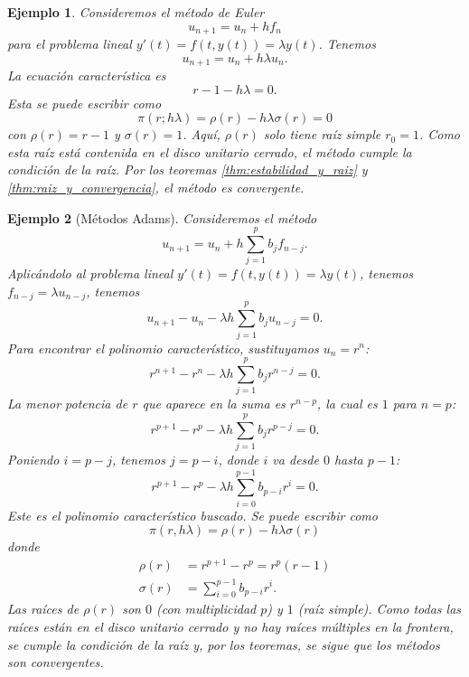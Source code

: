 \documentclass[11pt,letterpaper]{report}
\newtheorem{example}{Ejemplo}
\begin{document}
\begin{example}
  Consideremos el método de Euler
  \begin{equation}
    u_{n+1} = u_n + hf_n
  \end{equation}
  para el problema lineal $y'(t)=f(t,y(t))=\lambda y(t)$.
  Tenemos
  \begin{equation}
    u_{n+1} = u_n + h\lambda u_n
  .\end{equation}
  La ecuación característica es
  \begin{equation}
    r - 1 - h\lambda = 0
  .\end{equation}
  Esta se puede escribir como
  \begin{equation}
    \pi(r;h\lambda) = \rho(r) - h\lambda\sigma(r) = 0
  \end{equation}
  con $\rho(r)=r-1$ y $\sigma(r)=1$.
  Aquí, $\rho(r)$ solo tiene raíz simple $r_0=1$. Como esta raíz está
  contenida en el disco unitario cerrado, el método cumple la
  condición de la raíz. Por los teoremas
  \ref{thm:estabilidad_y_raiz} y \ref{thm:raiz_y_convergencia}, 
  el método es convergente.
\end{example}

\begin{example}[Métodos Adams]
  Consideremos el método
  \begin{equation}
    u_{n+1} = u_n + h \sum_{j=1}^{p}b_jf_{n-j}
  .\end{equation}
  Aplicándolo al problema lineal $y'(t)=f(t,y(t))=\lambda y(t)$,
  tenemos $f_{n-j}=\lambda u_{n-j}$, tenemos
  \begin{equation}
    u_{n+1} - u_n - \lambda h \sum_{j=1}^{p}b_ju_{n-j} = 0
  .\end{equation}
  Para encontrar el polinomio característico, sustituyamos
  $u_n=r^n$:
  \begin{equation}
    r^{n+1} - r^n - \lambda h \sum_{j=1}^{p}b_jr^{n-j} = 0
  .\end{equation}
  La menor potencia de $r$ que aparece en la suma es $r^{n-p}$,
  la cual es $1$ para $n=p$:
  \begin{equation}
    r^{p+1} - r^p - \lambda h \sum_{j=1}^{p}b_jr^{p-j} = 0
  .\end{equation}
  Poniendo $i=p-j$, tenemos $j=p-i$, donde $i$ va desde $0$ hasta
  $p-1$:
  \begin{equation}
    r^{p+1} - r^p - \lambda h \sum_{i=0}^{p-1}b_{p-i}r^{i} = 0
  .\end{equation}
  Este es el polinomio característico buscado. Se puede escribir como
  \begin{equation}
    \pi(r,h\lambda) = \rho(r) - h\lambda\sigma(r)
  \end{equation}
  donde
  \begin{align}
    \rho(r) &= r^{p+1}-r^p = r^p(r-1) \\
    \sigma(r) &= \sum_{i=0}^{p-1}b_{p-i}r^{i}
  .\end{align}
  Las raíces de $\rho(r)$ son $0$ (con multiplicidad $p$) y $1$ (raíz
  simple). Como todas las raíces están en el disco unitario cerrado y
  no hay raíces múltiples en la frontera, se cumple la condición de la
  raíz y, por los teoremas, se sigue que los métodos son convergentes.
\end{example}
\end{document}
